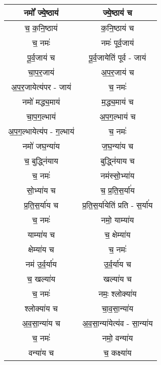 \subsection{}
{\centering
\begin{longtable}{|c|c|}
\hline
नमो᳚ ज्ये॒ष्ठाय॑                  & ज्ये॒ष्ठाय॑ च\\
\hline
च॒ क॒नि॒ष्ठाय॑                   & क॒नि॒ष्ठाय॑ च\\
\hline
च॒ नमः॑                       & नमः॑ पूर्व॒जाय॑\\
\hline
पू॒र्व॒जाय॑ च                    & पू॒र्व॒जायेति॑ पूर्व - जाय॑\\
\hline
चा॒प॒र॒जाय॑                     & अ॒प॒र॒जाय॑ च\\
\hline
अ॒प॒र॒जायेत्य॑पर - जाय॑            & च॒ नमः॑\\
\hline
नमो॑ मद्ध्य॒माय॑                 & म॒द्ध्य॒माय॑ च\\
\hline
चा॒प॒ग॒ल्भाय॑                    & अ॒प॒ग॒ल्भाय॑ च\\
\hline
अ॒प॒ग॒ल्भायेत्य॑प - ग॒ल्भाय॑          & च॒ नमः॑\\
\hline
नमो॑ जघ॒न्या॑य                  & ज॒घ॒न्या॑य च\\
\hline
च॒ बुद्ध्नि॑याय                  & बुद्ध्नि॑याय च\\
\hline
च॒ नमः॑                       & नम॑स्सो॒भ्या॑य\\
\hline
सो॒भ्या॑य च                    & च॒ प्र॒ति॒स॒र्या॑य\\
\hline
प्र॒ति॒स॒र्या॑य च                 & प्र॒ति॒स॒र्या॑येति॑ प्रति - स॒र्या॑य\\
\hline
च॒ नमः॑                       & नमो॒ याम्या॑य\\
\hline
याम्या॑य च                    & च॒ क्षेम्या॑य\\
\hline
क्षेम्या॑य च                    & च॒ नमः॑\\
\hline
नम॑ उ॒र्व॒र्या॑य                  & उ॒र्व॒र्या॑य च\\
\hline
च॒ खल्या॑य                     & खल्या॑य च\\
\hline
च॒ नमः॑                       & नमः॒ श्लोक्या॑य\\
\hline
श्लोक्या॑य च                   & चा॒व॒सा॒न्या॑य\\
\hline
अ॒व॒सा॒न्या॑य च                  & अ॒व॒सा॒न्या॑येत्य॑व - सा॒न्या॑य\\
\hline
च॒ नमः॑                       & नमो॒ वन्या॑य\\
\hline
वन्या॑य च                     & च॒ कक्ष्या॑य\\

\end{longtable}}
